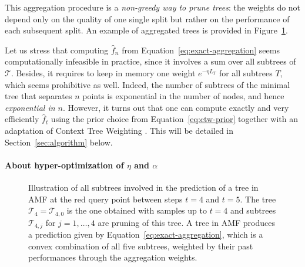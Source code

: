 \documentclass{article}
\newcommand{\tree}{\mathcal{T}} %
\begin{document}
This aggregation procedure is a \emph{non-greedy way to prune trees}: the weights do not depend only on the quality of one single split but rather on the performance of each subsequent split. An example of aggregated trees is provided in Figure~\ref{fig:algorithm-prediction}.

Let us stress that computing $\widehat f_n$ from Equation~\eqref{eq:exact-aggregation} seems computationally infeasible in practice, since it involves a sum over all subtrees of $\tree$.
Besides, it requires to keep in memory one weight $e^{-\eta L_T}$ for all subtrees $T$, which seems prohibitive as well.
Indeed, the number of subtrees of the minimal tree that separates $n$ points is exponential in the number of nodes, and hence \emph{exponential in $n$}.
However, it turns out that one can compute exactly and very efficiently $\widehat f_t$ using the prior choice from Equation~\eqref{eq:ctw-prior} together with an adaptation of Context Tree Weighting \cite{willems1995context-basic, willems1998context-extensions, helmbold1997pruning,catoni2004statistical}. 
This will be detailed in Section~\ref{sec:algorithm} below.


\paragraph{About hyper-optimization of $\eta$ and $\alpha$}




\begin{figure}[h!]
\begin{center}
% 
\caption{Illustration of all subtrees involved in the prediction of a tree in AMF at the red query point between steps $t=4$ and $t=5$. The tree $\tree_{4} = \tree_{4, 0}$ is the one obtained with samples up to $t=4$ and subtrees $\tree_{4,j}$ for $j = 1, \hdots, 4$ are pruning of this tree. A tree in AMF produces a prediction given by Equation~\eqref{eq:exact-aggregation}, which is a convex combination of all five subtrees, weighted by their past performances through the aggregation weights.}
\label{fig:algorithm-prediction}  
\end{center}
\end{figure}
\end{document}
